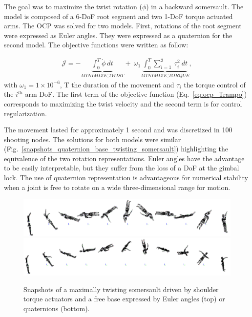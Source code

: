 The goal was to maximize the twist rotation ($\phi$) in a backward somersault.
The model is composed of a 6-DoF root segment and two 1-DoF torque actuated arms.
The OCP was solved for two models.
First, rotations of the root segment were expressed as Euler angles.
They were expressed as a quaternion for the second model.
The objective functions were written as follow:

\begin{eqnarray}\label{eq:ocp_Trampo}
\mathcal{J} = -\underbrace{\int_0^T \dot{\phi}~dt}_{MINIMIZE\_TWIST}  +~\omega_1 \underbrace{\int_0^T \sum_{i=1}^{2}~\tau_{i}^2~dt}_{MINIMIZE\_ TORQUE},
\end{eqnarray}
with $\omega_1 = 1\times 10^{-6}$, T the duration of the movement and $\tau_{i}$ the torque control of the $i^{th}$ arm DoF.
The first term of the objective function (Eq.~\ref{eq:ocp_Trampo}) corresponds to maximizing the twist velocity and the second term is for control regularization.


The movement lasted for approximately 1 second and was discretized in 100 shooting nodes.
The solutions for both models were similar (Fig.~\ref{snapshots_quaternion_base_twisting_somersault}) highlighting the equivalence of the two rotation representations.
Euler angles have the advantage to be easily interpretable, but they suffer from the loss of a DoF at the gimbal lock.
The use of quaternion representation is advantageous for numerical stability when a joint is free to rotate on a wide three-dimensional range for motion.


\begin{figure}[t!]
\centering
\includegraphics[width=\textwidth]{figures/Euler_Bioptim_MaxVrille_2.png}\\
\vspace*{0.5em}
\includegraphics[width=\textwidth]{figures/Quat_Bioptim_MaxVrille_2.png}
\caption{Snapshots of a maximally twisting somersault driven by shoulder torque actuators and a free base expressed by Euler angles (top) or quaternions (bottom).}
\label{fig:snapshots_quaternion_base_twisting_somersault}
\end{figure}



